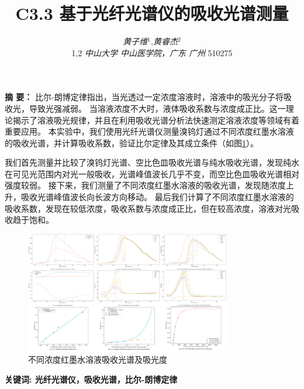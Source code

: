 \documentclass[12pt,a4paper,UTF8]{ctexart}
\begin{document}
\title{\vspace{-2cm}\LARGE\bfseries C3.3 基于光纤光谱仪的吸收光谱测量\footnotemark[1]}
\author{\large\textit{黄子维}$^{1}$\footnotemark[2],\large\textit{黄睿杰}$^{2}$\footnotemark[3] \\ 
\small{1,2 \textit{中山大学 中山医学院，广东 广州 }510275}}
\date{}
\maketitle
\setcounter{page}{0}
\thispagestyle{empty}
\vspace{-1.5em}
\begin{spacing}{2.0}
{\bfseries 摘 {} 要：}
比尔-朗博定律指出，当光透过一定浓度溶液时，溶液中的吸光分子将吸收光，导致光强减弱。
当溶液浓度不大时，液体吸收系数与浓度成正比。这一理论揭示了溶液吸光规律，并且在利用吸收光谱分析法快速测定溶液浓度等领域有着重要应用。
本实验中，我们使用光纤光谱仪测量溴钨灯通过不同浓度红墨水溶液的吸收光谱，并计算吸收系数，验证比尔定律及其成立条件（如图\ref{fig:0}）。

我们首先测量并比较了溴钨灯光谱、空比色皿吸收光谱与纯水吸收光谱，发现纯水在可见光范围内对光一般吸收，光谱峰值波长几乎不变，而空比色皿吸收光谱相对强度较弱。
接下来，我们测量了不同浓度红墨水溶液的吸收光谱，发现随浓度上升，吸收光谱峰值波长向长波方向移动。
最后我们计算了不同浓度红墨水溶液的吸收系数，发现在较低浓度，吸收系数与浓度成正比，但在较高浓度，溶液对光吸收趋于饱和。

\begin{figure}[htbp]
	\centering
	\includegraphics[width=0.8\textwidth]{attachments/Fig.0.pdf}
	\caption{不同浓度红墨水溶液吸收光谱及吸光度}
	\label{fig:0}
\end{figure}
\par
\vspace{-0.5em}
\bfseries{关键词}: 光纤光谱仪，吸收光谱，比尔-朗博定律
\vspace{0.5em}
\end{spacing}
\end{document}
